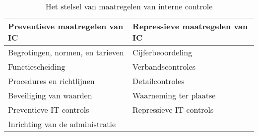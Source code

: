 \begin{table}[!h]
    \centering
    \caption{Het stelsel van maatregelen van interne controle \citep{bivpraktijk}}
    \begin{tabular}{l l}
        \toprule
        \textbf{Preventieve maatregelen van IC} & \textbf{Repressieve maatregelen van IC} \\
        \midrule
        Begrotingen, normen, en tarieven & Cijferbeoordeling \\
        Functiescheiding & Verbandscontroles \\
        Procedures en richtlijnen & Detailcontroles \\
        Beveiliging van waarden & Waarneming ter plaatse \\
        Preventieve IT-controls & Repressieve IT-controls \\
        Inrichting van de administratie \\
        \bottomrule
    \end{tabular}
    \label{tab:icmaatregelen}
\end{table}